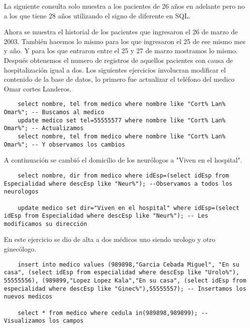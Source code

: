 \documentclass[12pt, titlepage]{article}
\begin{document}
	La siguiente consulta solo muestra a los pacientes de 26 años en adelante pero no a los que tiene 28 años utilizando el signo de diferente en SQL.
	
	Ahora se muestra el historial de los pacientes que ingresaron el 26 de marzo de 2003.
	También hacemos lo mismo para los que ingresaron el 25 de ese mismo mes y año.
	Y para los que entraron entre el 25 y 27 de marzo mostramos lo mismo.
	Después obtenemos el numero de registros de aquellos pacientes con causa de hospitalización igual a dos.
	Los siguientes ejercicios involucran modificar el contenido de la base de datos, lo primero fue actualizar el teléfono del medico Omar cortes Landeros.
	\begin{lstlisting}
	select nombre, tel from medico where nombre like "Cort% Lan% Omar%"; -- Buscamos al medico
	update medico set tel=55555577 where nombre like "Cort% Lan% Omar%"; -- Actualizamos
	select nombre, tel from medico where nombre like "Cort% Lan% Omar%"; -- Y observamos los cambios
	\end{lstlisting}
	A continuación se cambió el domicilio de los neurólogos a "Viven en el hospital".
	\begin{lstlisting}
	select nombre, dir from medico where idEsp=(select idEsp from Especialidad where descEsp like "Neur%"); --Observamos a todos los neurologos
	
	update medico set dir="Viven en el hospital" where idEsp=(select idEsp from Especialidad where descEsp like "Neur%"); -- Les modificamos su dirección
	\end{lstlisting}
	En este ejercicio se dio de alta a dos médicos uno siendo urologo y otro ginecólogo.
	\begin{lstlisting}
	insert into medico values (989898,"Garcia Cebada Miguel", "En su casa", (select idEsp from especialidad where descEsp like "Urolo%"), 55555556), (989899,"Lopez Lopez Kala","En su casa", (select idEsp from especialidad where descEsp like "Ginec%"),55555557); -- Insertamos los nuevos medicos
	
	select * from medico where cedula in(989898,989899); --Visualizamos los campos
	\end{lstlisting}
\end{document}
